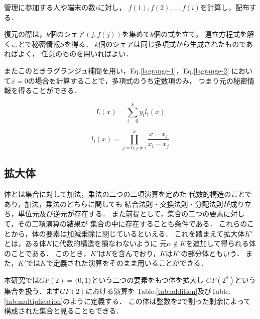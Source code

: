 \documentclass[twocolumn, fleqn, uplatex]{jsarticle}
\begin{document}
管理に参加する人や端末の数$i$に対し，%
$f(1),f(2),\dots,f(i)$を計算し，配布する．

復元の際は，$k$個のシェア$(j,f(j))$を集めて$k$個の式を立て，%
連立方程式を解くことで秘密情報$S$を得る．
$k$個のシェアは同じ多項式から生成されたものであればよく，%
任意のものを用いればよい．

またこのときラグランジュ補間を用い，Eq.\ref{lagrange-1}，Eq.\ref{lagrange-2}%
において$x=0$の場合を計算することで，多項式のうち定数項のみ，%
つまり元の秘密情報を得ることができる．

\begin{equation}
L(x) = \sum_{i=0}^{k}y_{i}l_{i}(x) \label{lagrange-1}
\end{equation}

\begin{equation}
l_{i}(x) = \prod_{j=0,j{\neq}i}^{k}{\frac{x-x_{j}}{x_{i}-x_{j}}} \label{lagrange-2}
\end{equation}

\subsection{拡大体}
体とは集合に対して加法，乗法の二つの二項演算を定めた%
代数的構造のことであり，加法，乗法のどちらに関しても%
結合法則・交換法則・分配法則が成り立ち，単位元及び逆元が存在する．%
また前提として，集合の二つの要素に対して，その二項演算の結果が%
集合の中に存在することも条件である．%
これらのことから，体の要素は加減乗除に閉じているといえる\cite{nozaki-1}．%
これを踏まえて拡大体$K'$とは，ある体$K$に代数的構造を損なわないように%
元${\alpha}{\notin}K$を追加して得られる体のことである．%
このとき，$K'$は$K$を含んでおり，$K$は$K'$の部分体ともいう．%
また，$K'$では$K$で定義された演算をそのまま用いることができる\cite{lit:siozaki}．

本研究では$GF(2)=\{0,1\}$という二つの要素をもつ体を拡大し%
$GF(2^8)$という集合を扱う．まず$GF(2)$における演算を%
Table.\ref{tab:addition}及びTable.\ref{tab:multiplication}のように定義する．%
この体は整数を$2$で割った剰余によって構成された集合と見ることもできる．
\end{document}
